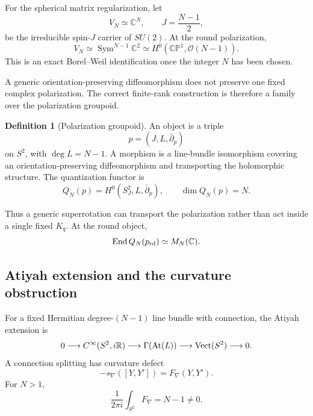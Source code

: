 \documentclass[aps,prd,preprint,nofootinbib,superscriptaddress]{revtex4-2}
\theoremstyle{definition}
\newtheorem{definition}[theorem]{Definition}
\theoremstyle{remark}
\newcommand{\cO}{\mathcal O}
\newcommand{\CP}{\mathbb{CP}}
\begin{document}
For the spherical matrix regularization, let
\begin{equation}
V_N\simeq\mathbb C^N,
\qquad
J=\frac{N-1}{2},
\label{eq:fuzzycarrier}
\end{equation}
be the irreducible spin-$J$ carrier of $SU(2)$.  At the round polarization,
\begin{equation}
V_N
\simeq
\operatorname{Sym}^{N-1}\mathbb C^2
\simeq
H^0(\CP^1,\cO(N-1)).
\label{eq:borelweil}
\end{equation}
This is an exact Borel--Weil identification once the integer $N$ has been chosen.

A generic orientation-preserving diffeomorphism does not preserve one fixed complex polarization.  The correct finite-rank construction is therefore a family over the polarization groupoid.

\begin{definition}[Polarization groupoid]
An object is a triple
\begin{equation}
p=(J,L,\bar\partial_p)
\end{equation}
on $S^2$, with $\deg L=N-1$.  A morphism is a line-bundle isomorphism covering an orientation-preserving diffeomorphism and transporting the holomorphic structure.  The quantization functor is
\begin{equation}
Q_N(p)
=
H^0(S^2_J,L,\bar\partial_p),
\qquad
\dim Q_N(p)=N.
\label{eq:polarizationfunctor}
\end{equation}
\end{definition}

Thus a generic superrotation can transport the polarization rather than act inside a single fixed $K_q$.  At the round object,
\begin{equation}
\operatorname{End} Q_N(p_{\rm rd})\simeq M_N(\mathbb C).
\end{equation}

\subsection{Atiyah extension and the curvature obstruction}

For a fixed Hermitian degree-$(N-1)$ line bundle with connection, the Atiyah extension \cite{Atiyah1957} is
\begin{equation}
0
\longrightarrow
C^\infty(S^2,i\mathbb R)
\longrightarrow
\Gamma({\rm At}(L))
\longrightarrow
{\rm Vect}(S^2)
\longrightarrow0.
\label{eq:atiyah}
\end{equation}
A connection splitting has curvature defect
\begin{equation}
[s_\nabla(Y),s_\nabla(Y')]
-
s_\nabla([Y,Y'])
=
F_\nabla(Y,Y').
\label{eq:atiyahcurv}
\end{equation}
For $N>1$,
\begin{equation}
\frac1{2\pi i}\int_{S^2}F_\nabla
=
N-1\neq0.
\label{eq:chernN}
\end{equation}
\end{document}
